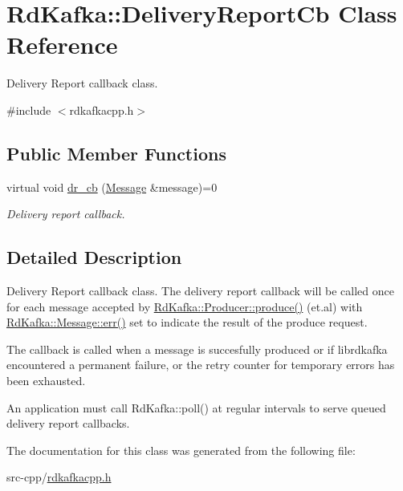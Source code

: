 \hypertarget{classRdKafka_1_1DeliveryReportCb}{
\section{RdKafka::DeliveryReportCb Class Reference}
\label{classRdKafka_1_1DeliveryReportCb}
}


Delivery Report callback class.  


{\ttfamily \#include $<$rdkafkacpp.h$>$}\subsection*{Public Member Functions}
\begin{DoxyCompactItemize}
\item 
\hypertarget{classRdKafka_1_1DeliveryReportCb_a9854b2576802b9e145e6ca402e1646ec}{
virtual void \hyperlink{classRdKafka_1_1DeliveryReportCb_a9854b2576802b9e145e6ca402e1646ec}{dr\_\-cb} (\hyperlink{classRdKafka_1_1Message}{Message} \&message)=0}
\label{classRdKafka_1_1DeliveryReportCb_a9854b2576802b9e145e6ca402e1646ec}

\begin{DoxyCompactList}\small\item\em Delivery report callback. \item\end{DoxyCompactList}\end{DoxyCompactItemize}


\subsection{Detailed Description}
Delivery Report callback class. The delivery report callback will be called once for each message accepted by \hyperlink{classRdKafka_1_1Producer_ab90a30c5e5fb006a3b4004dc4c9a7923}{RdKafka::Producer::produce()} (et.al) with \hyperlink{classRdKafka_1_1Message_a90df1fd2a73a74220c9581e6bedb42f2}{RdKafka::Message::err()} set to indicate the result of the produce request.

The callback is called when a message is succesfully produced or if librdkafka encountered a permanent failure, or the retry counter for temporary errors has been exhausted.

An application must call RdKafka::poll() at regular intervals to serve queued delivery report callbacks. 

The documentation for this class was generated from the following file:\begin{DoxyCompactItemize}
\item 
src-\/cpp/\hyperlink{rdkafkacpp_8h}{rdkafkacpp.h}\end{DoxyCompactItemize}
